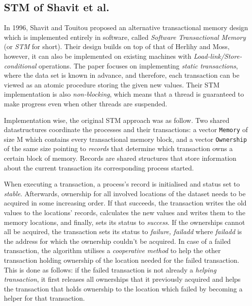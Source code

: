 \subsection{STM of Shavit et al.}
In 1996, Shavit and Touitou proposed an alternative transactional memory design which is implemented entirely in software, called \textit{Software Transactional Memory}\cite{shavit-stm} (or \textit{STM} for short). Their design builds on top of that of Herlihy and Moss, however, it can also be implemented on existing machines with \textit{Load-link/Store-conditional} operations\cite{shavit-stm}. The paper focuses on implementing \textit{static transactions}, where the data set is known in advance, and therefore, each transaction can be viewed as an atomic procedure storing the given new values\cite{shavit-stm}. Their STM implementation is also \textit{non-blocking}, which means that a thread is guaranteed to make progress even when other threads are suspended.

Implementation wise, the original STM approach was as follow. Two shared datastructures coordinate the processes and their transactions: a vector \texttt{Memory} of size M which contains every transactional memory block, and a vector \texttt{Ownership} of the same size pointing to \textit{records} that determine which transaction owns a certain block of memory. Records are shared structures that store information about the current transaction its corresponding process started. 

When executing a transaction, a process's record is initialised and status set to \textit{stable}. Afterwards, ownership for all involved locations of the dataset needs to be acquired in some increasing order. If that succeeds, the transaction writes the old values to the locations' records, calculates the new values and writes them to the memory locations, and finally, sets its status to \textit{success}. If the ownerships cannot all be acquired, the transaction sets its status to \textit{failure, failadd} where \textit{failadd} is the address for which the ownership couldn't be acquired\cite{shavit-stm}. In case of a failed transaction, the algorithm utilises a \textit{cooperative method} to help the other transaction holding ownership of the location needed for the failed transaction. This is done as follows: if the failed transaction is not already a \textit{helping transaction}, it first releases all ownerships that it previously acquired and helps the transaction that holds ownership to the location which failed by becoming a helper for that transaction\cite{shavit-stm}.


